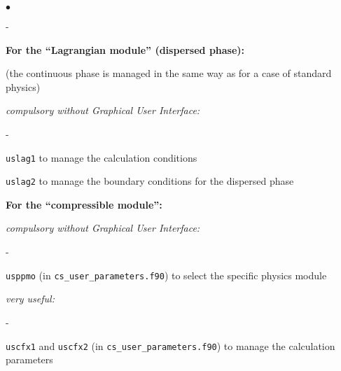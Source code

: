{{{\begin{list}{$\bullet$}{}
\begin{list}{}{}
\begin{list}{}{}
\begin{list}{-}{}
        \end{list}
    \end{list}



    \item{\bf For the ``Lagrangian module'' (dispersed phase):}

(the continuous phase is managed in the same way as for a case of standard
physics)
    \begin{list}{}{}
        \item {\em compulsory without Graphical User Interface:}
        \begin{list}{-}{}
            \item \texttt{uslag1} to manage the calculation conditions

            \item \texttt{uslag2} to manage the boundary conditions for the
             dispersed phase

        \end{list}

    \end{list}

   \item {\bf For the ``compressible module'':}

    \begin{list}{}{}
        \item {\em compulsory without Graphical User Interface:}
        \begin{list}{-}{}
            \item \texttt{usppmo} (in \texttt{cs\_user\_parameters.f90})
                  to select the specific physics module
        \end{list}
        \item {\em very useful:}
        \begin{list}{-}{}
            \item \texttt{uscfx1} and \texttt{uscfx2} (in \texttt{cs\_user\_parameters.f90})
                  to manage the calculation parameters


\end{list}
\end{list}
\end{list}
\end{list}}}}
